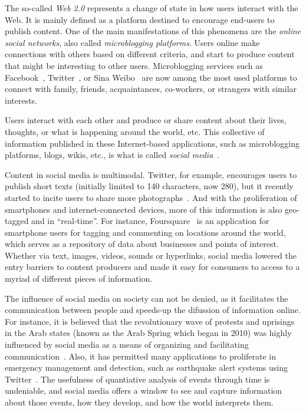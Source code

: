 \begin{intro}


The so-called {\em Web 2.0} represents a change of state in how users interact
with the Web.
%
It is mainly defined as a platform destined to encourage end-users to
publish content. 
%
One of the main manifestations of this phenomena are the {\em online social
networks}, also called {\em microblogging platforms}.
%
Users online make connections with others based on different criteria, and start
to produce content that might be interesting to other users. 
%
Microblogging services such as Facebook~\cite{facebook}, Twitter~\cite{twitter},
or Sina Weibo~\cite{weibo} are now among the most used platforms to connect with
family, friends, acquaintances, co-workers, or strangers with similar interests.

%
Users interact with each other and produce or share content about their lives,
thoughts, or what is happening around the world, etc.    
%
This collective of information published in these Internet-based applications,
such as microblogging platforms, blogs, wikis, etc., is what is called {\em
social media}~\cite{kaplan2010users}.



Content in social media is multimodal. 
%
Twitter, for example, encourages users to publish short texts (initially limited
to 140 characters, now 280), but it recently started to incite users to share
more photographs~\cite{brown_2019}.
%  
And with the proliferation of smartphones and internet-connected devices, more
of this information is also geo-tagged and in ``real-time''. 
%
For instance, Foursquare~\cite{foursquare} is an application for smartphone
users for tagging and commenting on locations around the world, which serves as
a repository of data about businesses and points of interest.
%
Whether via text, images, videos, sounds or hyperlinks, social media lowered the
entry barriers to content producers and made it easy for consumers to access to
a myriad of different pieces of information.





The influence of social media on society can not be denied, as it facilitates
the communication between people and speeds-up the difussion of information
online. 
%
For instance, it is believed that the revolutionary wave of protests and
uprisings in the Arab states (known as the Arab Spring which began in 2010) was
highly influenced by social media as a means of organizing and facilitating
communication~\cite{howard2011opening}. 
%
Also, it has permitted many applications to proliferate in emergency management
and detection, such as earthquake alert systems using
Twitter~\cite{Sakaki2010,Sarmiento:2018:DDE:3201064.3201077,Mendoza2019}.
%
The usefulness of quantiative analysis of events through time is undeniable, and
social media offers a window to see and capture information about those events,
how they develop, and how the world interprets them.




\end{intro}
